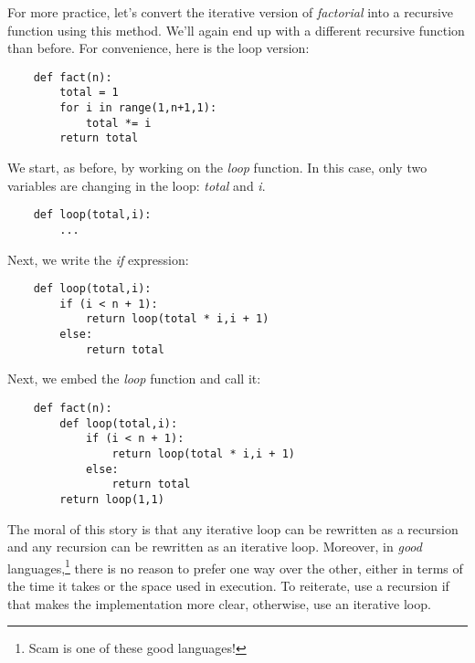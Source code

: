 For more practice, let's convert the iterative version of
{\it factorial} into a recursive function using this method.
We'll again end up with a different recursive function
than before. For convenience, here is the loop version:

\begin{verbatim}
    def fact(n):
        total = 1
        for i in range(1,n+1,1):
            total *= i
        return total
\end{verbatim}

We start, as before, by working on the {\it loop} function.
In this case,
only two variables are changing in the loop:
{\it total} and {\it i}.

\begin{verbatim}
    def loop(total,i):
        ...
\end{verbatim}

Next, we write the {\it if} expression:

\begin{verbatim}
    def loop(total,i):
        if (i < n + 1):
            return loop(total * i,i + 1)
        else:
            return total
\end{verbatim}

Next, we embed the {\it loop} function and call it:

\begin{verbatim}
    def fact(n):
        def loop(total,i):
            if (i < n + 1):
                return loop(total * i,i + 1)
            else:
                return total
        return loop(1,1)
\end{verbatim}

The moral of this story is that any iterative loop can be rewritten
as a recursion and any recursion can be rewritten as
an iterative loop. Moreover, in {\it good} languages,\footnote{
Scam is one of these good languages!}
there is no reason to prefer one way over the other,
either in terms of the time it takes or the space used
in execution. To reiterate,
use a recursion if that makes the implementation
more clear, otherwise, use an iterative loop.
